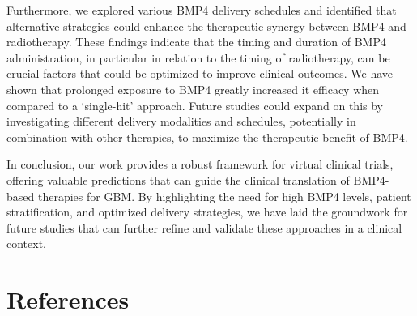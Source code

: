 \documentclass[
  default,
]{sn-jnl}
\begin{document}
Furthermore, we explored various BMP4 delivery schedules and identified
that alternative strategies could enhance the therapeutic synergy
between BMP4 and radiotherapy. These findings indicate that the timing
and duration of BMP4 administration, in particular in relation to the
timing of radiotherapy, can be crucial factors that could be optimized
to improve clinical outcomes. We have shown that prolonged exposure to
BMP4 greatly increased it efficacy when compared to a `single-hit'
approach. Future studies could expand on this by investigating different
delivery modalities and schedules, potentially in combination with other
therapies, to maximize the therapeutic benefit of BMP4.

In conclusion, our work provides a robust framework for virtual clinical
trials, offering valuable predictions that can guide the clinical
translation of BMP4-based therapies for GBM. By highlighting the need
for high BMP4 levels, patient stratification, and optimized delivery
strategies, we have laid the groundwork for future studies that can
further refine and validate these approaches in a clinical context.

\section*{References}\label{references}
\end{document}
